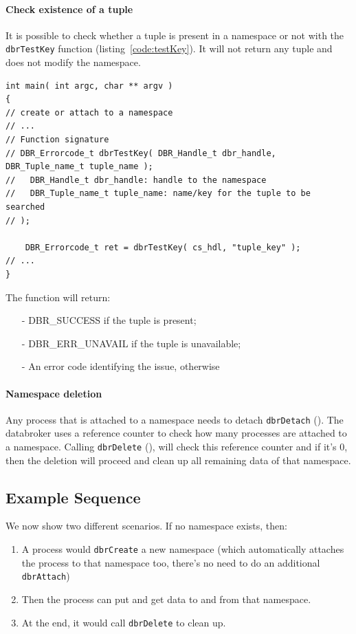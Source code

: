 \paragraph{Check existence of a tuple} It is possible to check whether a tuple is present in a namespace or not with the \texttt{dbrTestKey} function (listing~\ref{code:testKey}). It will not return any tuple and does not modify the namespace.

\begin{lstlisting}[style=mystyle,basicstyle=\scriptsize\ttfamily,caption=Check for the existence of a tuple in the Data Broker, label=code:testKey]
int main( int argc, char ** argv )
{
// create or attach to a namespace
// ...
// Function signature
// DBR_Errorcode_t dbrTestKey( DBR_Handle_t dbr_handle, DBR_Tuple_name_t tuple_name );
//   DBR_Handle_t dbr_handle: handle to the namespace
//   DBR_Tuple_name_t tuple_name: name/key for the tuple to be searched
// );

	DBR_Errorcode_t ret = dbrTestKey( cs_hdl, "tuple_key" );
// ...
}
\end{lstlisting}

The function will return:
\begin{itemize}
	\item[-] DBR\_SUCCESS if the tuple is present;
	\item[-] DBR\_ERR\_UNAVAIL if the tuple is unavailable;
	\item[-] An error code identifying the issue, otherwise
\end{itemize}



\paragraph{Namespace deletion} Any process that is attached to a
namespace needs to detach \texttt{dbrDetach} (). The databroker uses a
reference counter to check how many processes are attached to a
namespace.  Calling \texttt{dbrDelete} (), will check this reference counter
and if it's 0, then the deletion will proceed and clean up all
remaining data of that namespace.




\subsection{Example Sequence}
\label{sec:interface:example}
We now show two different scenarios.
If no namespace exists, then:
\begin{enumerate}
\item A process would \texttt{dbrCreate} a new namespace (which
  automatically attaches the process to that namespace too, there's no
  need to do an additional \texttt{dbrAttach})
\item Then the process can put and get data to and from that namespace.
\item At the end, it would call \texttt{dbrDelete} to clean up.
\end{enumerate}

